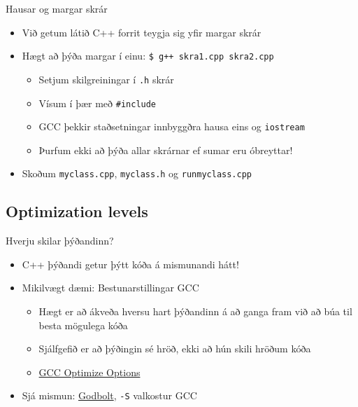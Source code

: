 \documentclass[handout]{beamer}
\begin{document}
\begin{frame}{Hausar og margar skrár}
\begin{itemize}
 \item Við getum látið C++ forrit teygja sig yfir margar skrár
 \item Hægt að þýða margar í einu: \texttt{\$ g++ skra1.cpp skra2.cpp}
 \begin{itemize}
  \item Setjum skilgreiningar í \texttt{.h} skrár
  \item Vísum í þær með \texttt{\#include}
  \item GCC þekkir staðsetningar innbyggðra hausa eins og \texttt{iostream}
  \item Þurfum ekki að þýða allar skrárnar ef sumar eru óbreyttar!
 \end{itemize}
 \item Skoðum \texttt{myclass.cpp}, \texttt{myclass.h} og \texttt{runmyclass.cpp}
\end{itemize}
\end{frame}

\subsection{Optimization levels}

\begin{frame}{Hverju skilar þýðandinn?}
\begin{itemize}
 \item C++ þýðandi getur þýtt kóða á mismunandi hátt!
 \item Mikilvægt dæmi: Bestunarstillingar GCC
 \begin{itemize}
  \item Hægt er að ákveða hversu hart þýðandinn á að ganga fram við að búa til besta mögulega kóða
  \item Sjálfgefið er að þýðingin sé hröð, ekki að hún skili hröðum kóða
  \item \href{https://gcc.gnu.org/onlinedocs/gcc/Optimize-Options.html}{GCC Optimize Options}
 \end{itemize}
 \item Sjá mismun: \href{http://godbolt.org/}{Godbolt}, \texttt{-S} valkostur GCC
\end{itemize}
\end{frame}
\end{document}
